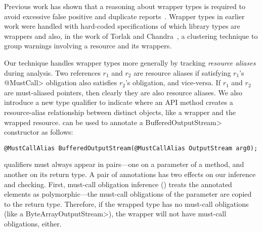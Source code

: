 Previous work has shown that a reasoning about wrapper types is
required to avoid excessive false positive and duplicate
reports~\cite{TorlakC10,ecj-resource-leak}.  Wrapper types in earlier
work were handled with hard-coded specifications of which library
types are wrappers and also, in the work of Torlak and
Chandra~\cite{TorlakC10}, a clustering technique to group warnings
involving a resource and its wrappers.

Our technique handles wrapper types more generally by tracking \emph{resource
aliases} during analysis.  Two references $r_1$ and $r_2$ are resource aliases
if satisfying $r_1$'s \<@MustCall> obligation also satisfies $r_2$'s
obligation, and vice-versa.  If $r_1$ and $r_2$ are must-aliased pointers, then
clearly they are also resource aliases.  We also introduce a new type
qualifier \mccannot to indicate where an API method creates a resource-alias
relationship between distinct objects, like a wrapper and the wrapped resource.
\mccannot can be used to annotate a \<BufferedOutputStream> constructor as follows:
\begin{lstlisting}
@MustCallAlias BufferedOutputStream(@MustCallAlias OutputStream arg0);
\end{lstlisting}

\mccannot qualifiers must always appear in pairs---one on a parameter
of a method, and another on its return type.  A pair of \mccannot
annotations has two effects on our inference and checking.  First,
must-call obligation inference () treats the
annotated elements as polymorphic---the must-call obligations of the
parameter are copied to the return type. Therefore, if the wrapped
type has no must-call obligations (like a \<ByteArrayOutputStream>),
the wrapper will not have must-call obligations, either.

